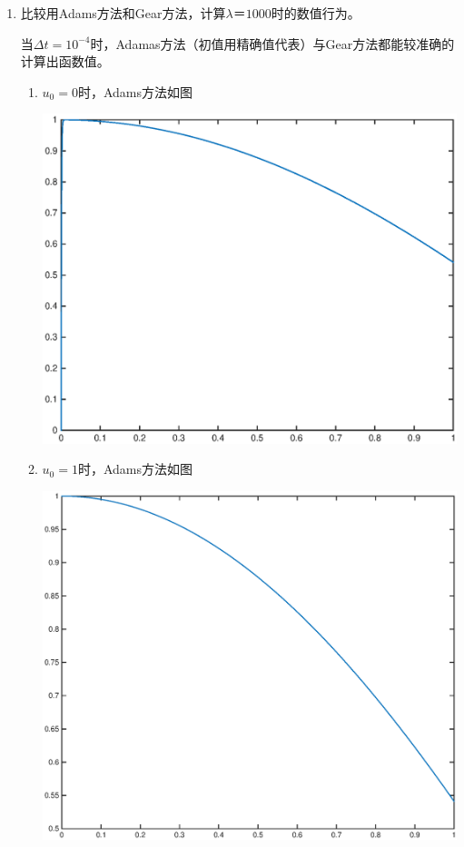 \documentclass{ctexart}
\begin{document}
\begin{enumerate}
\begin{enumerate}
\item 比较用Adams方法和Gear方法，计算\(\lambda＝1000\)时的数值行为。

当\(\Delta t = 10^{-4}\)时，Adamas方法（初值用精确值代表）与Gear方法都能较准确的计算出函数值。

\begin{enumerate}
\item  \(u_0=0\)时，Adams方法如图

\centerline{\includegraphics[width=5.5in]{Adams0.eps}}

\item  \(u_0=1\)时，Adams方法如图

\centerline{\includegraphics[width=5.5in]{Adams1.eps}}


\end{enumerate}
\end{enumerate}
\end{enumerate}
\end{document}
